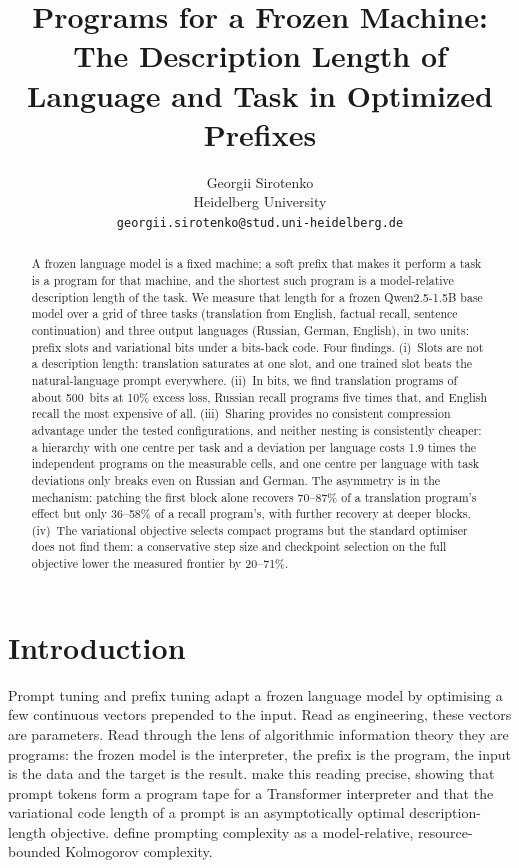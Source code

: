 \documentclass{article}
\title{Programs for a Frozen Machine:\\ The Description Length of Language and Task in Optimized Prefixes}
\author{%
  Georgii Sirotenko\\
  Heidelberg University\\
  \texttt{georgii.sirotenko@stud.uni-heidelberg.de}
}
\begin{document}
\maketitle

\begin{abstract}
A frozen language model is a fixed machine; a soft prefix that makes it perform a task is a program for that machine, and the shortest such program is a model-relative description length of the task. We measure that length for a frozen Qwen2.5-1.5B base model over a grid of three tasks (translation from English, factual recall, sentence continuation) and three output languages (Russian, German, English), in two units: prefix slots and variational bits under a bits-back code. Four findings. (i)~Slots are not a description length: translation saturates at one slot, and one trained slot beats the natural-language prompt everywhere. (ii)~In bits, we find translation programs of about 500~bits at 10\% excess loss, Russian recall programs five times that, and English recall the most expensive of all. (iii)~Sharing provides no consistent compression advantage under the tested configurations, and neither nesting is consistently cheaper: a hierarchy with one centre per task and a deviation per language costs 1.9 times the independent programs on the measurable cells, and one centre per language with task deviations only breaks even on Russian and German. The asymmetry is in the mechanism: patching the first block alone recovers 70--87\% of a translation program's effect but only 36--58\% of a recall program's, with further recovery at deeper blocks. (iv)~The variational objective selects compact programs but the standard optimiser does not find them: a conservative step size and checkpoint selection on the full objective lower the measured frontier by 20--71\%.
\end{abstract}

\section{Introduction}
Prompt tuning \citep{lester2021power} and prefix tuning \citep{li2021prefix} adapt a frozen language model by optimising a few continuous vectors prepended to the input. Read as engineering, these vectors are parameters. Read through the lens of algorithmic information theory they are programs: the frozen model is the interpreter, the prefix is the program, the input is the data and the target is the result. \citet{shaw2026bridging} make this reading precise, showing that prompt tokens form a program tape for a Transformer interpreter and that the variational code length of a prompt is an asymptotically optimal description-length objective. \citet{cosma2026prompting} define prompting complexity as a model-relative, resource-bounded Kolmogorov complexity.
\end{document}
